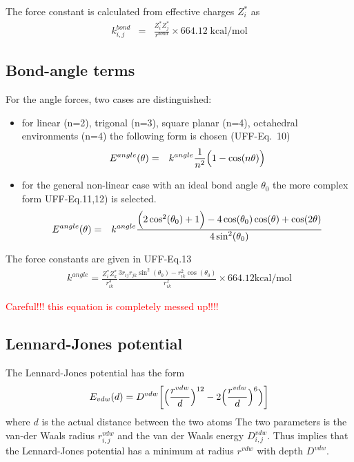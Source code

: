 \documentclass[11pt,a4paper]{report}
\begin{document}
The force constant is calculated from effective charges $Z^*_i$ as
\begin{eqnarray}
k^{bond}_{i,j}&=&\frac{Z^*_iZ^*_j}{r^{bond}}\times 664.12\;\text{kcal/mol}
\end{eqnarray}

\subsection{Bond-angle terms}
For the angle forces, two cases are distinguished: 
\begin{itemize}
\item for linear (n=2), trigonal (n=3), square planar (n=4), 
octahedral environments (n=4) the following form is chosen (UFF-Eq.~10)
\begin{eqnarray}
E^{angle}(\theta)&=&k^{angle}\frac{1}{n^2}\Bigl(1-\cos(n\theta)\Bigr) 
\end{eqnarray}
\item for the general non-linear case with an ideal bond angle $\theta_0$
the more complex form UFF-Eq.11,12) is selected.
\begin{eqnarray}
E^{angle}(\theta)&=&k^{angle}
\frac{\Bigl(2\cos^2(\theta_0)+1\Bigr)
-4\cos(\theta_0)\cos(\theta)
+\cos(2\theta)}{4\sin^2(\theta_0)}
\end{eqnarray}
\end{itemize}


The force constants are given in UFF-Eq.13
\begin{eqnarray}
k^{angle}= \frac{Z^*_iZ^*_k}{r_{ik}^3}
\frac{3r_{ij}r_{jk}\sin^2(\theta_0)
-r_{ik}^2\cos(\theta_0)}{r_{ik}^2}
\times 664.12 \text{kcal/mol}
\end{eqnarray}

\textcolor{red}{Careful!!! this equation is completely messed up!!!!}

\subsection{Lennard-Jones potential}
The Lennard-Jones potential has the form 
\begin{eqnarray}
E_{vdw}(d)=D^{vdw}\biggl[\Bigl(\frac{r^{vdw}}{d}\Bigr)^{12}-2
\Bigl(\frac{r^{vdw}}{d}\Bigr)^{6}\Bigr)\biggr]
\end{eqnarray}
where $d$ is the actual distance between the two atoms The two
parameters is the van-der Waals radius $r^{vdw}_{i,j}$ and the van der
Waals energy $D^{vdw}_{i,j}$.  Thus implies that the Lennard-Jones
potential has a minimum at radius $r^{vdw}$ with depth $D^{vdw}$.
\end{document}
